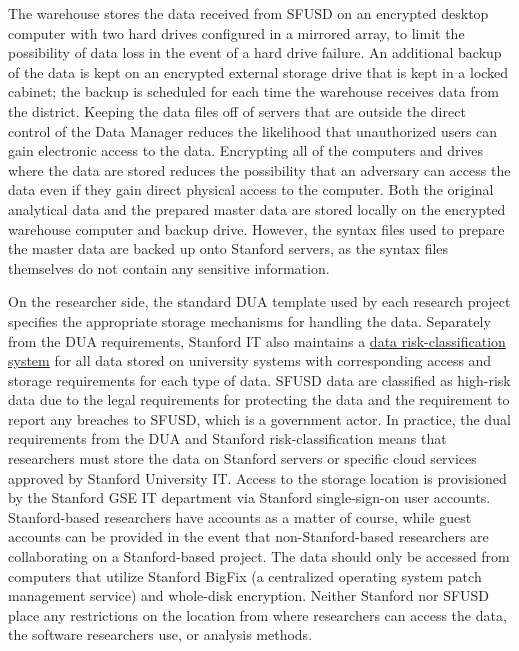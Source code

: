 \documentclass[
]{WileySix}
\begin{document}
The warehouse stores the data received from SFUSD on an encrypted desktop computer with two hard drives configured in a mirrored array, to limit the possibility of data loss in the event of a hard drive failure. An additional backup of the data is kept on an encrypted external storage drive that is kept in a locked cabinet; the backup is scheduled for each time the warehouse receives data from the district. Keeping the data files off of servers that are outside the direct control of the Data Manager reduces the likelihood that unauthorized users can gain electronic access to the data. Encrypting all of the computers and drives where the data are stored reduces the possibility that an adversary can access the data even if they gain direct physical access to the computer. Both the original analytical data and the prepared master data are stored locally on the encrypted warehouse computer and backup drive. However, the syntax files used to prepare the master data are backed up onto Stanford servers, as the syntax files themselves do not contain any sensitive information.

On the researcher side, the standard DUA template used by each research project specifies the appropriate storage mechanisms for handling the data. Separately from the DUA requirements, Stanford IT also maintains a \href{https://uit.stanford.edu/guide/riskclassifications}{data risk-classification system} for all data stored on university systems with corresponding access and storage requirements for each type of data. SFUSD data are classified as high-risk data due to the legal requirements for protecting the data and the requirement to report any breaches to SFUSD, which is a government actor. In practice, the dual requirements from the DUA and Stanford risk-classification means that researchers must store the data on Stanford servers or specific cloud services approved by Stanford University IT. Access to the storage location is provisioned by the Stanford GSE IT department via Stanford single-sign-on user accounts. Stanford-based researchers have accounts as a matter of course, while guest accounts can be provided in the event that non-Stanford-based researchers are collaborating on a Stanford-based project. The data should only be accessed from computers that utilize Stanford BigFix (a centralized operating system patch management service) and whole-disk encryption. Neither Stanford nor SFUSD place any restrictions on the location from where researchers can access the data, the software researchers use, or analysis methods.
\end{document}
